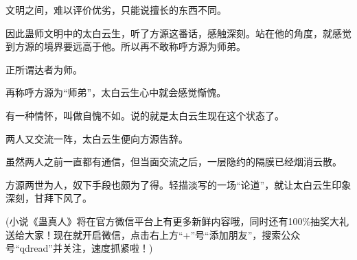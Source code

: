 \begin{this_body}
文明之间，难以评价优劣，只能说擅长的东西不同。

因此蛊师文明中的太白云生，听了方源这番话，感触深刻。站在他的角度，就感觉到方源的境界要远高于他。所以再不敢称呼方源为师弟。

正所谓达者为师。

再称呼方源为“师弟”，太白云生心中就会感觉惭愧。

有一种情怀，叫做自愧不如。说的就是太白云生现在这个状态了。

两人又交流一阵，太白云生便向方源告辞。

虽然两人之前一直都有通信，但当面交流之后，一层隐约的隔膜已经烟消云散。

方源两世为人，奴下手段也颇为了得。轻描淡写的一场“论道”，就让太白云生印象深刻，甘拜下风了。

(小说《蛊真人》将在官方微信平台上有更多新鲜内容哦，同时还有100\%抽奖大礼送给大家！现在就开启微信，点击右上方“+”号“添加朋友”，搜索公众号“qdread”并关注，速度抓紧啦！)

\end{this_body}

